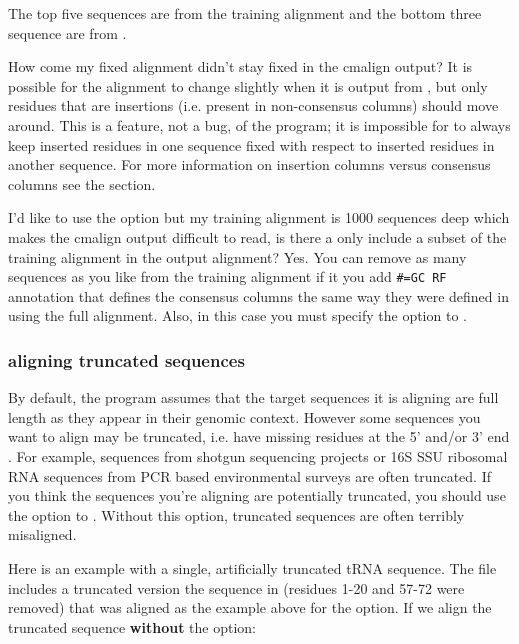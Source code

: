 The top five sequences are from the training alignment 
and the bottom three sequence are from .

\begin{srefaq}{How come my fixed alignment didn't stay fixed in the
cmalign output?} It is possible for the  alignment
to change slightly when it is output from , but only
residues that are insertions (i.e. present in non-consensus columns)
should move around. This is a feature, not a bug, of the program; it is
impossible for  to always keep inserted residues in one sequence fixed
with respect to inserted residues in another sequence. For more
information on insertion columns versus consensus columns see the
 section.
\end{srefaq}

\begin{srefaq}{I'd like to use the  option but my training
    alignment is 1000 sequences deep which makes the cmalign output
    difficult to read, is there a only include a subset of the
    training alignment in the output alignment?} Yes.  You can remove
    as many sequences as you like from the training alignment if it
    you add {\small\verb+#=GC RF+} annotation that defines the
    consensus columns the same way they were defined in 
    using the full alignment. Also, in this case you must specify the
     option to .
  \end{srefaq}

\subsubsection{aligning truncated sequences}
By default, the  program assumes that the target
sequences it is aligning are full length as they appear in their genomic
context. However some sequences you want to align may be truncated,
i.e.  have missing residues at the 5' and/or 3' end . For example,
sequences from shotgun sequencing projects or 16S SSU ribosomal RNA
sequences from PCR based environmental surveys are often truncated. If
you think the sequences you're aligning are potentially truncated, you
should use the  option to . Without this
option, truncated sequences are often terribly misaligned.

Here is an example with a single, artificially truncated tRNA
sequence. The file  includes a truncated
version the sequence in  (residues 1-20 and 57-72
were removed) that was aligned as the example above for 
the  option. If we align the truncated sequence
\textbf{without} the  option: 

